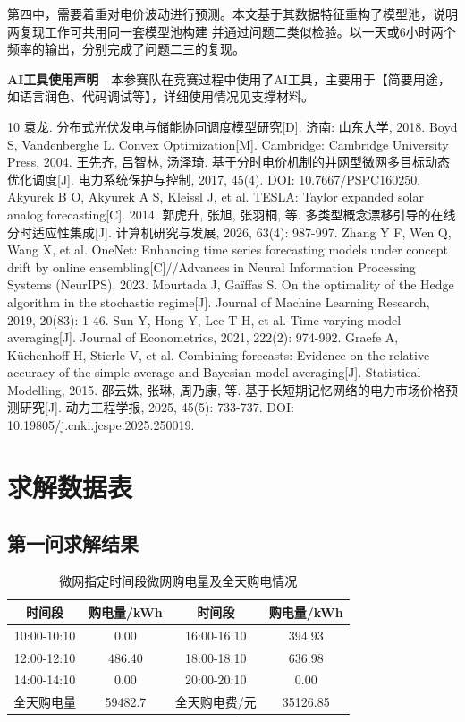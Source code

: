 \documentclass[zihao=-4,a4paper,fontset=none]{ctexart}
\begin{document}
第四中，需要着重对电价波动进行预测。本文基于其数据特征重构了模型池，说明两复现工作可共用同一套模型池构建
并通过问题二类似检验。以一天或6小时两个频率的输出，分别完成了问题二三的复现。


\textbf{AI工具使用声明}\ \ 本参赛队在竞赛过程中使用了AI工具，主要用于【简要用途，如语言润色、代码调试等】，详细使用情况见支撑材料。
\newpage
{\small
\begin{thebibliography}{10}
 袁龙. 分布式光伏发电与储能协同调度模型研究[D]. 济南: 山东大学, 2018.
 Boyd S, Vandenberghe L. Convex Optimization[M]. Cambridge: Cambridge University Press, 2004.
 王先齐, 吕智林, 汤泽琦. 基于分时电价机制的并网型微网多目标动态优化调度[J]. 电力系统保护与控制, 2017, 45(4). DOI: 10.7667/PSPC160250.
 Akyurek B O, Akyurek A S, Kleissl J, et al. TESLA: Taylor expanded solar analog forecasting[C]. 2014.
 郭虎升, 张旭, 张羽桐, 等. 多类型概念漂移引导的在线分时适应性集成[J]. 计算机研究与发展, 2026, 63(4): 987-997.
 Zhang Y F, Wen Q, Wang X, et al. OneNet: Enhancing time series forecasting models under concept drift by online ensembling[C]//Advances in Neural Information Processing Systems (NeurIPS). 2023.
 Mourtada J, Ga\"{i}ffas S. On the optimality of the Hedge algorithm in the stochastic regime[J]. Journal of Machine Learning Research, 2019, 20(83): 1-46.
 Sun Y, Hong Y, Lee T H, et al. Time-varying model averaging[J]. Journal of Econometrics, 2021, 222(2): 974-992.
 Graefe A, K\"{u}chenhoff H, Stierle V, et al. Combining forecasts: Evidence on the relative accuracy of the simple average and Bayesian model averaging[J]. Statistical Modelling, 2015.
 邵云姝, 张琳, 周乃康, 等. 基于长短期记忆网络的电力市场价格预测研究[J]. 动力工程学报, 2025, 45(5): 733-737. DOI: 10.19805/j.cnki.jcspe.2025.250019.
\end{thebibliography}
}
\appendix
\newpage
\section{求解数据表}

\subsection{第一问求解结果}

\begin{table}[htbp]
\centering
\caption{微网指定时间段微网购电量及全天购电情况}
{\small
\begin{tabular}{cccc}
\toprule
时间段 & 购电量/kWh & 时间段 & 购电量/kWh \\
\midrule
10:00-10:10 & 0.00 & 16:00-16:10 & 394.93 \\
12:00-12:10 & 486.40 & 18:00-18:10 & 636.98 \\
14:00-14:10 & 0.00 & 20:00-20:10 & 0.00 \\
\midrule
全天购电量 & 59482.7 & 全天购电费/元 & 35126.85 \\
\bottomrule
\end{tabular}}
\label{tab:buy}
\end{table}
\end{document}
